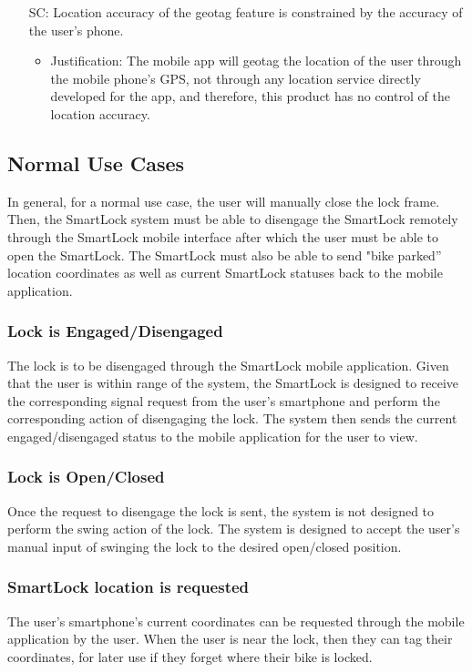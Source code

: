 \documentclass[12pt]{article}
\newcounter{scnum} %
\begin{document}
\begin{itemize}
\item[SC\refstepcounter{scnum}\thescnum\label{SC7}:] Location accuracy of the geotag feature is constrained by the accuracy of the user's phone.
	\begin{itemize}
		\item Justification: The mobile app will geotag the location of the user through the mobile phone's GPS, not through any location service directly developed for the app, and therefore, this product has no control of the location accuracy.
	\end{itemize}


\end{itemize}

\subsection{Normal Use Cases}
In general, for a normal use case, the user will manually close the lock frame. Then, the SmartLock system must be able to disengage the SmartLock remotely through the SmartLock mobile interface after which the user must be able to open the SmartLock.  The SmartLock must also be able to send "bike parked” location coordinates as well as current SmartLock statuses back to the mobile application. 
\subsubsection{Lock is Engaged/Disengaged}
The lock is to be disengaged through the SmartLock mobile application.  Given that the user is within range of the system, the SmartLock is designed to receive the corresponding signal request from the user’s smartphone and perform the corresponding action of disengaging the lock.  The system then sends the current engaged/disengaged status to the mobile application for the user to view.
\subsubsection{Lock is Open/Closed}
Once the request to disengage the lock is sent, the system is not designed to perform the swing action of the lock. The system is designed to accept the user’s manual input of swinging the lock to the desired open/closed position.  
\subsubsection{SmartLock location is requested}
The user’s smartphone's current coordinates can be requested through the mobile application by the user.  When the user is near the lock, then they can tag their coordinates, for later use if they forget where their bike is locked.  
\end{document}
